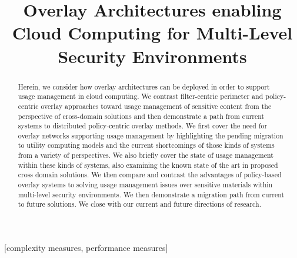 \documentclass{sig-alternate}
\begin{document}
\title{Overlay Architectures enabling Cloud Computing for Multi-Level Security Environments}


\maketitle

\begin{abstract}
Herein,  we consider how overlay architectures can be deployed in order to support usage management in cloud computing.  We contrast filter-centric perimeter and policy-centric overlay approaches toward usage management of sensitive content from the perspective of cross-domain solutions and then demonstrate a path from current systems to distributed policy-centric overlay methods.  We first cover the need for overlay networks supporting usage management by highlighting the pending migration to utility computing models and the current shortcomings of those kinds of systems from a variety of perspectives.  We also briefly cover the state of usage management within these kinds of systems, also examining the known state of the art in proposed cross domain solutions.  We then compare and contrast the advantages of policy-based overlay systems to solving usage management issues over sensitive materials within multi-level security environments. We then demonstrate a migration path from current to future solutions.  We close with our current and future directions of research. 
\end{abstract}

[complexity measures, performance measures]

\end{document}
